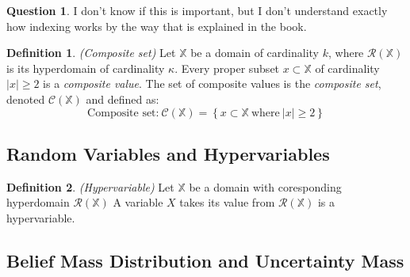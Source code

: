 \documentclass[a4paper,12pt]{article}
\theoremstyle{definition}
\newtheorem{question}{Question}[section]
\newtheorem{definition}{Definition}[section]
\numberwithin{equation}{section}
\begin{document}
\begin{question}
	I don't know if this is important, but I don't understand exactly how indexing works by the way that is explained in the book.
\end{question}

\begin{definition}
	\emph{(Composite set)} Let $\mathbb{X}$ be a domain of cardinality $k$, where $\mathcal{R}(\mathbb{X})$ is its hyperdomain of cardinality $\kappa$. Every proper subset $x \subset \mathbb{X}$ of cardinality $\left|x\right| \geq 2$ is a \emph{composite value}. The set of composite values is the \emph{composite set}, denoted $\mathcal{C}(\mathbb{X})$ and defined as:
	\begin{equation}
		\text{Composite set:}\ \mathcal{C}(\mathbb{X}) = \left\{x \subset \mathbb{X}\ \text{where}\ \left|x\right| \geq 2\right\}
	\end{equation}
\end{definition}

\subsection{Random Variables and Hypervariables}

\begin{definition}
	\emph{(Hypervariable)} Let $\mathbb{X}$ be a domain with coresponding hyperdomain $\mathcal{R}(\mathbb{X})$ A variable $X$ takes its value from $\mathcal{R}(\mathbb{X})$ is a hypervariable.
\end{definition}

\subsection{Belief Mass Distribution and Uncertainty Mass}
\end{document}
